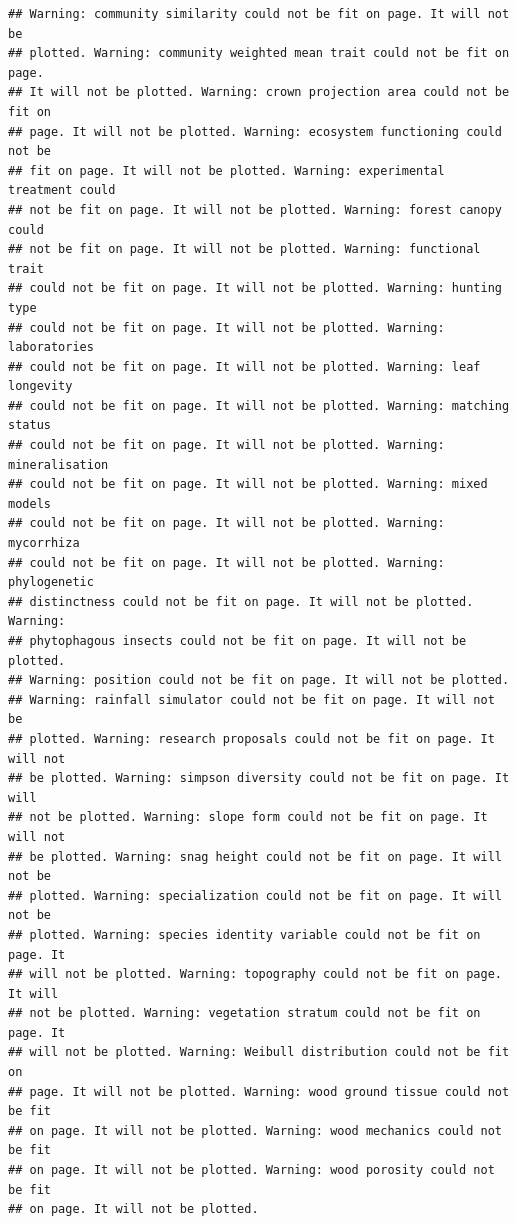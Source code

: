 \documentclass[]{article}
\begin{document}
\begin{verbatim}
## Warning: community similarity could not be fit on page. It will not be
## plotted. Warning: community weighted mean trait could not be fit on page.
## It will not be plotted. Warning: crown projection area could not be fit on
## page. It will not be plotted. Warning: ecosystem functioning could not be
## fit on page. It will not be plotted. Warning: experimental treatment could
## not be fit on page. It will not be plotted. Warning: forest canopy could
## not be fit on page. It will not be plotted. Warning: functional trait
## could not be fit on page. It will not be plotted. Warning: hunting type
## could not be fit on page. It will not be plotted. Warning: laboratories
## could not be fit on page. It will not be plotted. Warning: leaf longevity
## could not be fit on page. It will not be plotted. Warning: matching status
## could not be fit on page. It will not be plotted. Warning: mineralisation
## could not be fit on page. It will not be plotted. Warning: mixed models
## could not be fit on page. It will not be plotted. Warning: mycorrhiza
## could not be fit on page. It will not be plotted. Warning: phylogenetic
## distinctness could not be fit on page. It will not be plotted. Warning:
## phytophagous insects could not be fit on page. It will not be plotted.
## Warning: position could not be fit on page. It will not be plotted.
## Warning: rainfall simulator could not be fit on page. It will not be
## plotted. Warning: research proposals could not be fit on page. It will not
## be plotted. Warning: simpson diversity could not be fit on page. It will
## not be plotted. Warning: slope form could not be fit on page. It will not
## be plotted. Warning: snag height could not be fit on page. It will not be
## plotted. Warning: specialization could not be fit on page. It will not be
## plotted. Warning: species identity variable could not be fit on page. It
## will not be plotted. Warning: topography could not be fit on page. It will
## not be plotted. Warning: vegetation stratum could not be fit on page. It
## will not be plotted. Warning: Weibull distribution could not be fit on
## page. It will not be plotted. Warning: wood ground tissue could not be fit
## on page. It will not be plotted. Warning: wood mechanics could not be fit
## on page. It will not be plotted. Warning: wood porosity could not be fit
## on page. It will not be plotted.
\end{verbatim}
\end{document}
